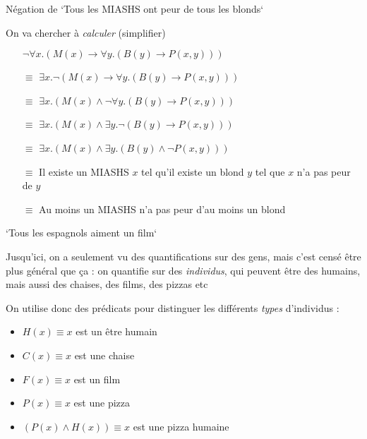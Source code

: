 \begin{frame}

Négation de `Tous les MIASHS ont peur de tous les blonds`\newline\pause

On va chercher à \textit{calculer} (simplifier) 
\begin{itemize}
\item[] $\neg \forall x. (M(x) \rightarrow \forall y. (B(y) \rightarrow P(x,y)))$\pause
\item[$\equiv$] $\exists x. \neg  (M(x) \rightarrow \forall y. (B(y) \rightarrow P(x,y)))$\pause
\item[$\equiv$] $\exists x. (M(x) \wedge \neg \forall y. (B(y) \rightarrow P(x,y)))$\pause
\item[$\equiv$] $\exists x. (M(x) \wedge \exists y. \neg (B(y) \rightarrow P(x,y)))$\pause
\item[$\equiv$] $\exists x. (M(x) \wedge \exists y. (B(y) \wedge \neg P(x,y)))$\pause
\item[$\equiv$] Il existe un MIASHS $x$ tel qu'il existe un blond $y$ tel que $x$ n'a pas peur de $y$\pause
\item[$\equiv$] Au moins un MIASHS n'a pas peur d'au moins un blond
\end{itemize}
\end{frame}
	
\begin{frame}

`Tous les espagnols aiment un film`\pause\newline

Jusqu'ici, on a seulement vu des quantifications sur des gens, mais c'est censé être plus général que ça \pause : on quantifie sur des \textit{individus}, qui peuvent être des humains, mais aussi des chaises, des films, des pizzas etc\pause\newline

On utilise donc des prédicats pour distinguer les différents \textit{types} d'individus : 
\begin{itemize}
\item $H(x) \equiv x $ est un être humain
\item $C(x) \equiv x $ est une chaise
\item $F(x) \equiv x $ est un film
\item $P(x) \equiv x $ est une pizza\pause
\item $(P(x) \wedge H(x)) \equiv x $ est une pizza humaine
\end{itemize}

\end{frame}
	
